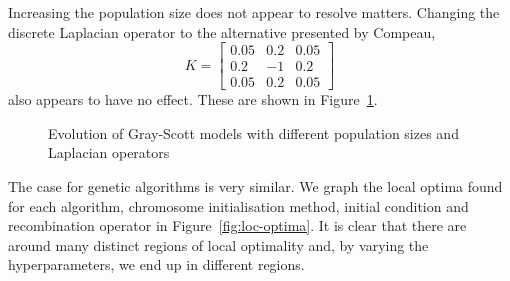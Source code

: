 Increasing the population size does not appear to resolve matters. Changing the discrete Laplacian operator to the alternative presented by Compeau\cite{compeau},
\[
  K= \begin{bmatrix}
    0.05 & 0.2 & 0.05\\
    0.2 & -1 & 0.2\\
    0.05 & 0.2 & 0.05
  \end{bmatrix}
\]
also appears to have no effect. These are shown in Figure~\ref{fig:more-fails}.\\

\begin{figure}[!h]
\centering
            \hfill
            \hfill
            \hfill
            \hfill
            \caption{Evolution of Gray-Scott models with different population sizes and Laplacian operators}
\label{fig:more-fails}
\end{figure}

The case for genetic algorithms is very similar. We graph the local optima found for each algorithm, chromosome initialisation method, initial condition and recombination operator in Figure~\ref{fig:loc-optima}. It is clear that there are around many distinct regions of local optimality and, by varying the hyperparameters, we end up in different regions.\\

